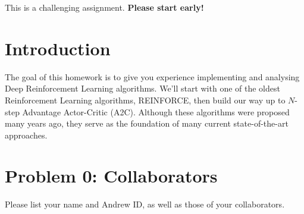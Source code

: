 \documentclass[12pt]{article}
\begin{document}
This is a challenging assignment. \textbf{Please start early!}



\newpage
\section*{Introduction}
The goal of this homework is to give you experience implementing and analysing Deep Reinforcement Learning algorithms. We'll start with one of the oldest Reinforcement Learning algorithms, REINFORCE, then build our way up to $N$-step Advantage Actor-Critic (A2C). Although these algorithms were proposed many years ago, they serve as the foundation of many current state-of-the-art approaches.

\section*{Problem 0: Collaborators}
Please list your name and Andrew ID, as well as those of your collaborators.
\end{document}
